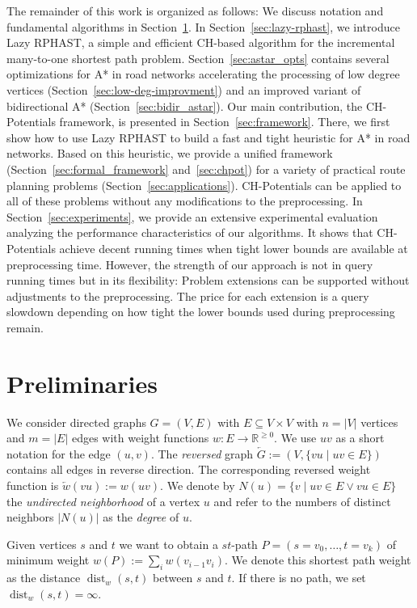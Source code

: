 \documentclass[manuscript,review]{acmart}
\newcommand*{\dist}{\operatorname{dist}}
\begin{document}
The remainder of this work is organized as follows:
We discuss notation and fundamental algorithms in Section~\ref{sec:preliminaries}.
In Section~\ref{sec:lazy-rphast}, we introduce Lazy RPHAST, a simple and efficient CH-based algorithm for the incremental many-to-one shortest path problem.
Section~\ref{sec:astar_opts} contains several optimizations for A* in road networks accelerating the processing of low degree vertices (Section~\ref{sec:low-deg-improvment}) and an improved variant of bidirectional A* (Section~\ref{sec:bidir_astar}).
Our main contribution, the CH-Potentials framework, is presented in Section~\ref{sec:framework}.
There, we first show how to use Lazy RPHAST to build a fast and tight heuristic for A* in road networks.
Based on this heuristic, we provide a unified framework (Section~\ref{sec:formal_framework} and~\ref{sec:chpot}) for a variety of practical route planning problems (Section~\ref{sec:applications}).
CH-Potentials can be applied to all of these problems without any modifications to the preprocessing.
In Section~\ref{sec:experiments}, we provide an extensive experimental evaluation analyzing the performance characteristics of our algorithms.
It shows that CH-Potentials achieve decent running times when tight lower bounds are available at preprocessing time.
However, the strength of our approach is not in query running times but in its flexibility:
Problem extensions can be supported without adjustments to the preprocessing.
The price for each extension is a query slowdown depending on how tight the lower bounds used during preprocessing remain.

\section{Preliminaries}\label{sec:preliminaries}

We consider directed graphs $G=(V,E)$ with $E \subseteq V \times V$ with $n=|V|$ vertices and $m=|E|$ edges with weight functions $w : E \to \mathbb{R}^{\geq 0}$.
We use $uv$ as a short notation for the edge $(u,v)$.
The \emph{reversed} graph $\overleftarrow{G} := (V, \{ vu \mid uv \in E \})$ contains all edges in reverse direction.
The corresponding reversed weight function is $\overleftarrow{w}(vu) := w(uv)$.
We denote by $N(u) = \{ v \mid uv \in E \vee vu \in E \}$ the \emph{undirected neighborhood} of a vertex $u$ and refer to the numbers of distinct neighbors $|N(u)|$ as the \emph{degree} of $u$.

Given vertices $s$ and $t$ we want to obtain a $st$-path $P=(s=v_0,\dots,t=v_k)$ of minimum weight $w(P) := \sum_{i} w(v_{i-1}v_i)$.
We denote this shortest path weight as the distance $\dist_w(s,t)$ between $s$ and $t$.
If there is no path, we set $\dist_w(s,t)=\infty$.
\end{document}
